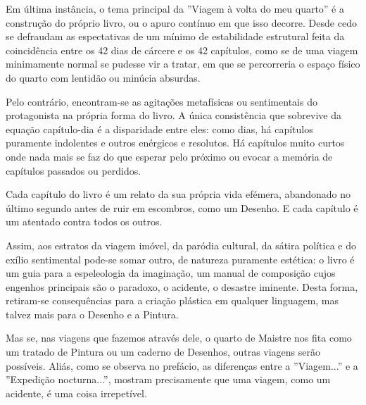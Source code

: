 \documentclass[12pt]{article}
\begin{document}
Em última instância, o tema principal da ''Viagem à volta do meu
quarto'' é a construção do próprio livro, ou o apuro contínuo em que
isso decorre. Desde cedo se defraudam as espectativas de um mínimo de
estabilidade estrutural feita da coincidência entre os 42 dias de
cárcere e os 42 capítulos, como se de uma viagem minimamente normal se
pudesse vir a tratar, em que se percorreria o espaço físico do quarto
com lentidão ou minúcia absurdas.

Pelo contrário, encontram-se as agitações metafísicas ou sentimentais
do protagonista na própria forma do livro. A única consistência que
sobrevive da equação capítulo-dia é a disparidade entre eles: como
dias, há capítulos puramente indolentes e outros enérgicos e
resolutos. Há capítulos muito curtos onde nada mais se faz do que
esperar pelo próximo ou evocar a memória de capítulos passados ou
perdidos.

Cada capítulo do livro é um relato da sua própria vida efémera,
abandonado no último segundo antes de ruir em escombros, como um
Desenho. E cada capítulo é um atentado contra todos os outros.

Assim, aos estratos da viagem imóvel, da paródia cultural, da sátira
política e do exílio sentimental pode-se somar outro, de natureza
puramente estética: o livro é um guia para a espeleologia da
imaginação, um manual de composição cujos engenhos principais são o
paradoxo, o acidente, o desastre iminente. Desta forma, retiram-se
consequências para a criação plástica em qualquer linguagem, mas
talvez mais para o Desenho e a Pintura.

Mas se, nas viagens que fazemos através dele, o quarto de Maistre nos
fita como um tratado de Pintura ou um caderno de Desenhos, outras
viagens serão possíveis. Aliás, como se observa no prefácio, as
diferenças entre a ''Viagem...'' e a ''Expedição nocturna...'',
mostram precisamente que uma viagem, como um acidente, é uma coisa
irrepetível.

\printbibliography[heading=bibliography,title={Bibliografia}]
\end{document}
